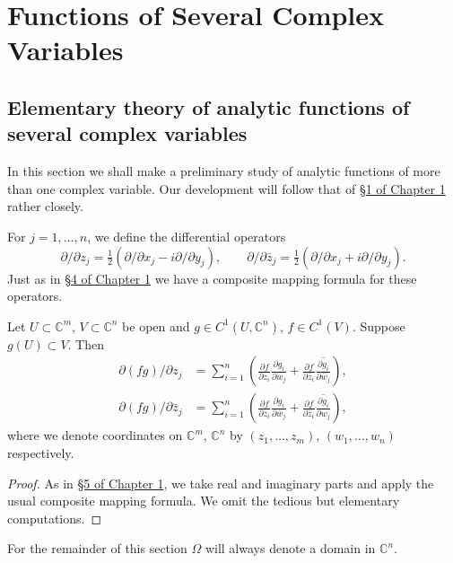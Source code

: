 \chapter{Functions of Several Complex Variables}\label{ch:2}
\ChapterTwoIntroduction

\section{Elementary theory of analytic functions of several complex variables}\label{sec:2:1}
In this section we shall make a preliminary study of analytic functions of more than one complex variable. Our development will follow that of \hyperref[sec:1:1]{\S1 of Chapter 1} rather closely.

For $j=1,\ldots,n$, we define the differential operators
\[
\partial/\partial z_j=\tfrac12(\partial/\partial x_j-i\partial/\partial y_j),\qquad
\partial/\partial\bar z_j=\tfrac12(\partial/\partial x_j+i\partial/\partial y_j).
\]
Just as in \hyperref[sec:1:4]{\S4 of Chapter 1} we have a composite mapping formula for these operators.

 Let $U\subset\mathbb C^m$, $V\subset\mathbb C^n$ be open and $g\in C^1(U,\mathbb C^n)$, $f\in C^1(V)$. Suppose $g(U)\subset V$. Then
\begin{align*}
\partial(fg)/\partial z_j&=\sum_{i=1}^n\left(\frac{\partial f}{\partial z_i}\frac{\partial g_i}{\partial w_j}+\frac{\partial f}{\partial\bar z_i}\overline{\frac{\partial g_i}{\partial\bar w_j}}\right),\\
\partial(fg)/\partial\bar z_j&=\sum_{i=1}^n\left(\frac{\partial f}{\partial z_i}\frac{\partial g_i}{\partial\bar w_j}+\frac{\partial f}{\partial\bar z_i}\overline{\frac{\partial g_i}{\partial w_j}}\right),
\end{align*}
where we denote coordinates on $\mathbb C^m$, $\mathbb C^n$ by $(z_1,\ldots,z_m)$, $(w_1,\ldots,w_n)$ respectively.
\begin{proof}
As in \hyperref[sec:1:5]{\S5 of Chapter 1}, we take real and imaginary parts and apply the usual composite mapping formula. We omit the tedious but elementary computations.
\end{proof}

For the remainder of this section $\Omega$ will always denote a domain in $\mathbb C^n$.

